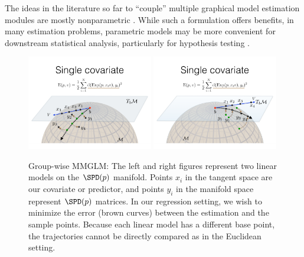 The ideas in the literature so far to ``couple'' multiple graphical model estimation modules are mostly nonparametric \citep{zhou2010time, mcardle2000introduction,qiu2015joint}. 
While such a formulation offers benefits, in many estimation problems, 
parametric models may 
be more convenient for downstream statistical analysis,
particularly for hypothesis testing \citep{hardle1993comparing,geer2000empirical,roehrig1988conditions}.
\begin{figure}[t]
  \centering
  \includegraphics[width=0.49\textwidth,trim={10 40 10 220},clip]{diss/3_covtraj/figs/MGLM1.png}
    \includegraphics[width=0.49\textwidth,trim={10 40 10 220},clip]{diss/3_covtraj/figs/MGLM2.png}
  \caption[Group-wise Manifold Fitting and Testing]{\small\label{fig:manifold}Group-wise MMGLM: The left and right figures represent two linear models on the $\SPD(p)$ manifold. Points $x_i$ in the tangent space are our covariate or predictor, and points $y_i$ in the manifold space represent $\SPD(p)$ matrices. In our regression setting, we wish to minimize the error (brown curves) between the estimation and the sample points. Because each linear model has a different base point, the trajectories cannot be directly compared as in the Euclidean setting.}
\end{figure}

